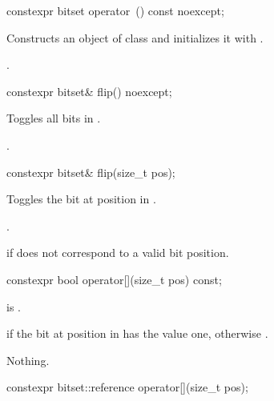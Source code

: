 %
\begin{itemdecl}
constexpr bitset operator~() const noexcept;
\end{itemdecl}

\begin{itemdescr}
\pnum
\effects
Constructs an object  of class
and initializes it with
.

\pnum
\returns
{}.
\end{itemdescr}

%
\begin{itemdecl}
constexpr bitset& flip() noexcept;
\end{itemdecl}

\begin{itemdescr}
\pnum
\effects
Toggles all bits in
.

\pnum
\returns
{}.
\end{itemdescr}

%
\begin{itemdecl}
constexpr bitset& flip(size_t pos);
\end{itemdecl}

\begin{itemdescr}
\pnum
\effects
Toggles the bit at position  in
.

\pnum
\returns
{}.

\pnum
\throws
{}%
 if  does not correspond to a valid bit position.
\end{itemdescr}

%
\begin{itemdecl}
constexpr bool operator[](size_t pos) const;
\end{itemdecl}

\begin{itemdescr}
\pnum
\hardexpects
{} is .

\pnum
\returns
{} if the bit at position  in  has the value
one, otherwise .

\pnum
\throws
Nothing.
\end{itemdescr}

%
\begin{itemdecl}
constexpr bitset::reference operator[](size_t pos);
\end{itemdecl}

